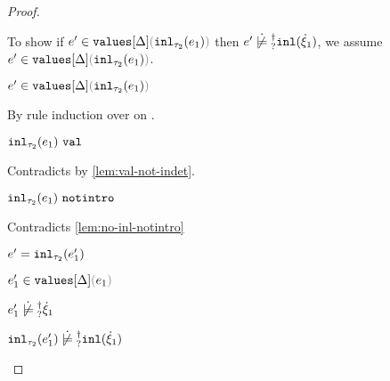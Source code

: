 \begin{proof}
\begin{byCases}
\begin{byCases}
\begin{byCases}
\begin{byCases}
            To show if $\inValues{e'}{\Delta}{\hinl{\tau_2}{e_1}}$ then $\cnotsatisfyormay{e'}{\cinl{\hxi_1}}$, we assume $\inValues{e'}{\Delta}{\hinl{\tau_2}{e_1}}$.
            \begin{pfsteps*}
            \item $\inValues{e'}{\Delta}{\hinl{\tau_2}{e_1}}$  
            \end{pfsteps*}
            By rule induction over  on .
            \begin{byCases}
              \item[\text{(\ref{rule:IVVal})}]
              \begin{pfsteps*}
              \item $\mathtt{inl}_{\tau_2}({e_1}) ~\mathtt{val}$ 
              \end{pfsteps*} 
              Contradicts  by \autoref{lem:val-not-indet}.
              \item[\text{(\ref{rule:IVIndet})}] 
              \begin{pfsteps*}
              \item $\mathtt{inl}_{\tau_2}({e_1}) ~\mathtt{notintro}$ 
              \end{pfsteps*} 
              Contradicts \autoref{lem:no-inl-notintro}
              \item[\text{(\ref{rule:IVInl})}] 
              \begin{pfsteps*}
              \item $e'=\mathtt{inl}_{\tau_2}({e_1'})$ 
              \item $\inValues{e_1'}{\Delta}{e_1}$  
              \item $\cnotsatisfyormay{e_1'}{\hxi_1}$  
              \item $\cnotsatisfyormay{\hinl{\tau_2}{e_1'}}{\cinl{\hxi_1}}$ 
              \end{pfsteps*} 
            \end{byCases}
          \end{byCases}
          \item[\text{(\ref{rule:IInr})}] 
          \begin{pfsteps*}

\end{pfsteps*}
\end{byCases}
\end{byCases}
\end{byCases}
\end{proof}
